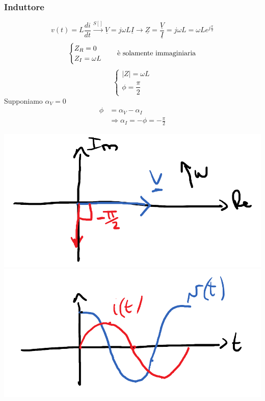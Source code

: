 \documentclass{article}
\begin{document}
\subsubsection*{Induttore}
\[
    v(t)=L \frac{di}{dt} \overset{S[]}{\longrightarrow} \underline{V} = j \omega L \underline{I} \longrightarrow \underline{Z} = \frac{\underline{V}}{\underline{I}} = j \omega L = \omega L e^{j \frac{\pi}{2}}
\]
\[
    \begin{cases}
        Z_R=0\\
        Z_I=\omega L
    \end{cases}
    \ \ \ \text{è solamente immaginiaria}
\]
\[
    \begin{cases}
        |Z|=\omega L\\
        \phi = \dfrac{\pi}{2}
    \end{cases}
\]
Supponiamo $\alpha_V=0$
\begin{align*}
    \phi &= \alpha_V - \alpha_I \\
    &\Longrightarrow \alpha_I = - \phi = -\frac{\pi}{2}
\end{align*}
\begin{center}
    \includegraphics[scale=0.22]{Image/Regime_sinusoidale_7.png}
    \includegraphics[scale=0.22]{Image/Regime_sinusoidale_8.png}
\end{center}
\end{document}
